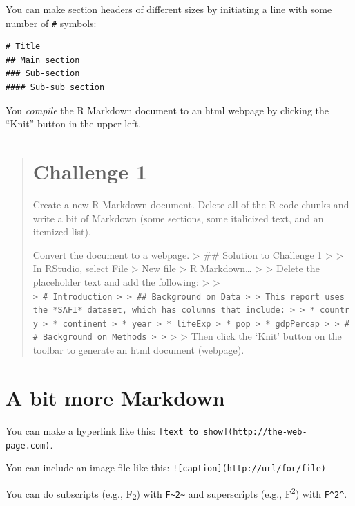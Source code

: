 \documentclass[]{book}
\begin{document}
You can make section headers of different sizes by initiating a line
with some number of \texttt{\#} symbols:

\begin{verbatim}
# Title
## Main section
### Sub-section
#### Sub-sub section
\end{verbatim}

You \emph{compile} the R Markdown document to an html webpage by
clicking the ``Knit'' button in the upper-left.

\begin{quote}
\section{Challenge 1}\label{challenge-1-1}

Create a new R Markdown document. Delete all of the R code chunks and
write a bit of Markdown (some sections, some italicized text, and an
itemized list).

Convert the document to a webpage. \textgreater{} \#\# Solution to
Challenge 1 \textgreater{} \textgreater{} In RStudio, select File
\textgreater{} New file \textgreater{} R Markdown\ldots{} \textgreater{}
\textgreater{} Delete the placeholder text and add the following:
\textgreater{} \textgreater{}
\texttt{\textgreater{}\ \#\ Introduction\ \textgreater{}\ \textgreater{}\ \#\#\ Background\ on\ Data\ \textgreater{}\ \textgreater{}\ This\ report\ uses\ the\ *SAFI*\ dataset,\ which\ has\ columns\ that\ include:\ \textgreater{}\ \textgreater{}\ *\ country\ \textgreater{}\ *\ continent\ \textgreater{}\ *\ year\ \textgreater{}\ *\ lifeExp\ \textgreater{}\ *\ pop\ \textgreater{}\ *\ gdpPercap\ \textgreater{}\ \textgreater{}\ \#\#\ Background\ on\ Methods\ \textgreater{}\ \textgreater{}}
\textgreater{} \textgreater{} Then click the `Knit' button on the
toolbar to generate an html document (webpage).
\end{quote}

\section{A bit more Markdown}\label{a-bit-more-markdown}

You can make a hyperlink like this:
\texttt{{[}text\ to\ show{]}(http://the-web-page.com)}.

You can include an image file like this:
\texttt{!{[}caption{]}(http://url/for/file)}

You can do subscripts (e.g., F\textsubscript{2}) with
\texttt{F\textasciitilde{}2\textasciitilde{}} and superscripts (e.g.,
F\textsuperscript{2}) with \texttt{F\^{}2\^{}}.
\end{document}
